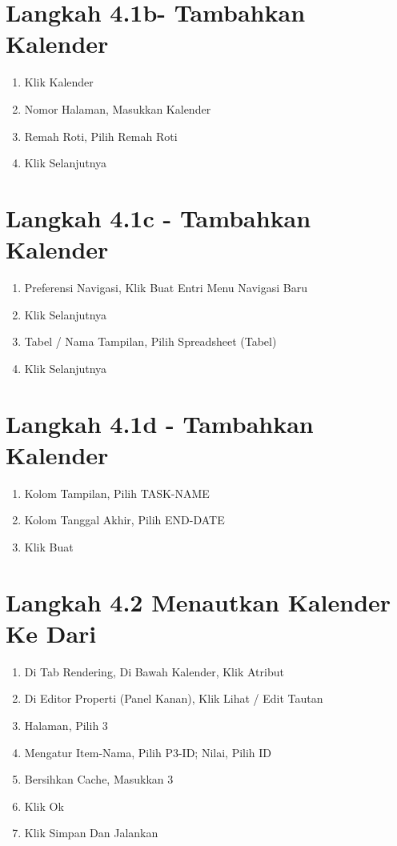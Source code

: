 \documentclass{article}
\begin{document}
\section{Langkah 4.1b- Tambahkan Kalender}
\begin{enumerate}
    \item Klik Kalender
    \item Nomor Halaman, Masukkan Kalender
    \item Remah Roti, Pilih Remah Roti
    \item Klik Selanjutnya

\end{enumerate}
\section{Langkah 4.1c - Tambahkan Kalender}
\begin{enumerate}
    \item Preferensi Navigasi, Klik Buat Entri Menu Navigasi Baru
    \item Klik Selanjutnya
    \item Tabel / Nama Tampilan, Pilih Spreadsheet (Tabel)
    \item Klik Selanjutnya
\end{enumerate}
\section{Langkah 4.1d - Tambahkan Kalender}
\begin{enumerate}
    \item Kolom Tampilan, Pilih TASK-NAME
    \item Kolom Tanggal Akhir, Pilih END-DATE
    \item Klik Buat

\end{enumerate}
\section{Langkah 4.2  Menautkan Kalender Ke Dari}
\begin{enumerate}
    \item Di Tab Rendering, Di Bawah Kalender, Klik Atribut
\item Di Editor Properti (Panel Kanan), Klik Lihat / Edit Tautan
\item Halaman, Pilih 3
\item Mengatur Item-Nama, Pilih P3-ID; Nilai, Pilih ID
\item Bersihkan Cache, Masukkan 3
\item Klik Ok
\item Klik Simpan Dan Jalankan


\end{enumerate}
\end{document}
